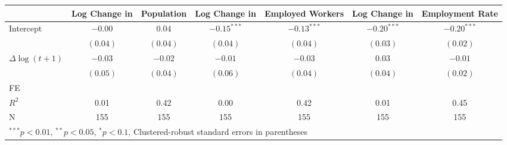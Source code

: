 
\begin{tabular}{l c c c c c c }
\hline
 & Log Change in & Population & Log Change in & Employed Workers & Log Change in & Employment Rate \\
\hline
Intercept & $-0.00$  & $0.04$   & $-0.15^{***}$ & $-0.13^{***}$ & $-0.20^{***}$ & $-0.20^{***}$ \\
            & $(0.04)$ & $(0.04)$ & $(0.04)$      & $(0.04)$      & $(0.03)$      & $(0.02)$      \\
$\Delta \log(t+1)$     & $-0.03$  & $-0.02$  & $-0.01$       & $-0.03$       & $0.03$        & $-0.01$       \\
            & $(0.05)$ & $(0.04)$ & $(0.06)$      & $(0.04)$      & $(0.04)$      & $(0.02)$      \\
\hline
FE          &                &                &                &                &                &                \\ 
\hline
$R^2$       & 0.01     & 0.42     & 0.00          & 0.42          & 0.01          & 0.45          \\
N           & 155      & 155      & 155           & 155           & 155           & 155           \\
\hline
\multicolumn{7}{l}{\scriptsize{$^{***}p<0.01$, $^{**}p<0.05$, $^*p<0.1$, Clustered-robust standard errors in parentheses}}
\end{tabular}
